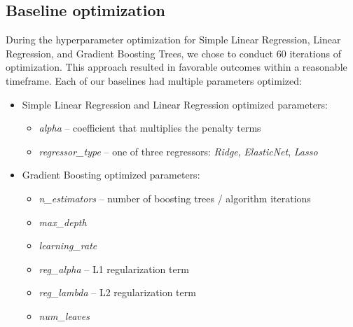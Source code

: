 \subsection{Baseline optimization}
During the hyperparameter optimization for Simple Linear Regression, Linear Regression, and Gradient Boosting Trees, we chose to conduct 60 iterations of optimization. This approach resulted in favorable outcomes within a reasonable timeframe. Each of our baselines had multiple parameters optimized:
\begin{itemize}
    \item Simple Linear Regression and Linear Regression optimized parameters:
    \begin{itemize}
        \item \emph{alpha} -- coefficient that multiplies the penalty terms
        \item \emph{regressor\_type} -- one of three regressors: \emph{Ridge}, \emph{ElasticNet}, \emph{Lasso}
    \end{itemize}
    \item Gradient Boosting optimized parameters:
    \begin{itemize}
        \item \emph{n\_estimators} -- number of boosting trees / algorithm iterations
        \item \emph{max\_depth}
        \item \emph{learning\_rate}
        \item \emph{reg\_alpha} -- L1 regularization term
        \item \emph{reg\_lambda} -- L2 regularization term
        \item \emph{num\_leaves}
    \end{itemize}
\end{itemize}

